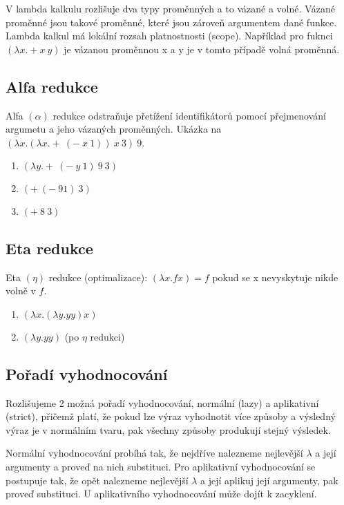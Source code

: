 \documentclass{szzclass}
\begin{document}
V lambda kalkulu rozlišuje dva typy proměnných a to vázané a volné. Vázané proměnné jsou takové proměnné, které jsou zároveň argumentem
dané funkce. Lambda kalkul má lokální rozsah platnostnosti (scope).
Například pro fuknci $(\lambda x . + x\ y)$ je vázanou proměnnou x a y je v tomto případě volná proměnná.

\newpage

\subsection{Alfa redukce}

Alfa $(\alpha)$ redukce odstraňuje přetížení identifikátorů pomocí přejmenování argumetu a jeho vázaných proměnných.
Ukázka na $(\lambda x . (\lambda x . +\ (-\ x\ 1))\ x\ 3)\ 9$.
\begin{enumerate}
    \item $(\lambda y . +\ (-\ y\ 1)\ 9\ 3)$
    \item $(+\ (-\ 9 1)\ 3)$
    \item $(+\ 8\ 3)$
\end{enumerate}


\subsection{Eta redukce}
Eta $(\eta)$ redukce (optimalizace): $(\lambda x. fx) = f$ pokud se x nevyskytuje nikde volně v $f$.

\begin{enumerate}
    \item $(\lambda x.(\lambda y.yy)x)$
    \item $(\lambda y. yy)$ (po $\eta$ redukci)
\end{enumerate}


\subsection{Pořadí vyhodnocování}

Rozlišujeme 2 možná pořadí vyhodnocování, normální (lazy) a aplikativní (strict), přičemž platí, že pokud lze výraz
vyhodnotit více způsoby a výsledný výraz je v normálním tvaru, pak všechny způsoby produkují stejný výsledek.

Normální vyhodnocování probíhá tak, že nejdříve nalezneme nejlevější $\lambda$ a její argumenty a proveď na nich substituci.
Pro aplikativní vyhodnocování se postupuje tak, že opět nalezneme nejlevější $\lambda$ a její aplikuj její argumenty, pak proveď substituci.
U aplikativního vyhodnocování může dojít k zacyklení.
\end{document}
